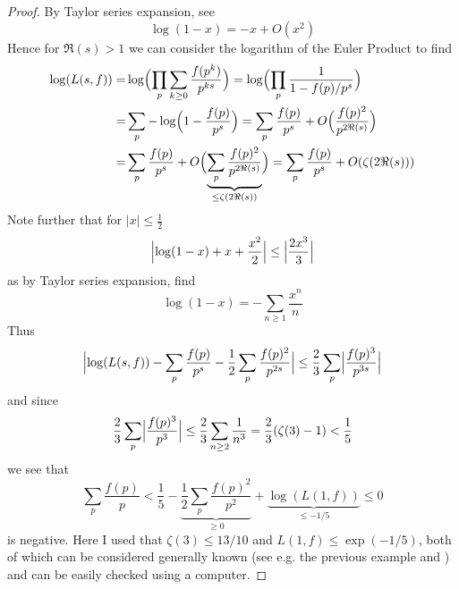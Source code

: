 \documentclass{scrartcl}
\theoremstyle{definition}
\begin{document}
\begin{proof}
    By Taylor series expansion, see
    \begin{equation*}
        \log(1 - x) = -x + O(x^2)
    \end{equation*}
    Hence for $\Re(s) > 1$ we can consider the logarithm of the Euler Product to find
    \begin{align*}
        \log( L(s, f) ) =& \log\Bigl( \prod_p \sum_{k \geq 0} \frac {f(p^k)} {p^{ks}} \Bigr) = \log\Bigl( \prod_p \frac 1 {1 - f(p)/p^s} \Bigr) \\
        =& \sum_p -\log\Bigl( 1 - \frac {f(p)} {p^s} \Bigr) = \sum_p \frac {f(p)} {p^s} + O\Bigl( \frac {f(p)^2} {p^{2\Re(s)}} \Bigr) \\
        = & \sum_p \frac {f(p)} {p^s} + O\Bigl( \underbrace{\sum_p \frac {f(p)^2} {p^{2\Re(s)}}}_{\leq \zeta(2\Re(s))} \Bigr) = \sum_p \frac {f(p)} {p^s} + O(\zeta(2\Re(s)))
    \end{align*}
    Note further that for $|x| \leq \frac 1 2$
    \begin{align*}
        \Bigl| \log(1 - x) + x + \frac {x^2} 2 \Bigr| \leq \Bigl| \frac {2x^3} 3 \Bigr|
    \end{align*}
    as by Taylor series expansion, find
    \begin{equation*}
        \log(1 - x) = -\sum_{n \geq 1} \frac {x^n} {n}
    \end{equation*}
    Thus
    \begin{align*}
        \Bigl| \log(L(s, f)) - \sum_p \frac {f(p)} {p^s} - \frac 1 2 \sum_p \frac {f(p)^2} {p^{2s}} \Bigr| \leq \frac 2 3 \sum_p \Bigl| \frac {f(p)^3} {p^{3s}} \Bigr|
    \end{align*}
    and since
    \begin{equation*}
        \frac 2 3 \sum_p \Bigl| \frac {f(p)^3} {p^3} \Bigr| \leq \frac 2 3 \sum_{n \geq 2} \frac 1 {n^3} = \frac 2 3 (\zeta(3) - 1) < \frac 1 5
    \end{equation*}
    we see that
    \begin{equation*}
        \sum_p \frac {f(p)} p < \frac 1 5 - \underbrace{\frac 1 2 \sum_p \frac {f(p)^2} {p^2}}_{\geq 0} + \underbrace{\log(L(1, f))}_{\leq -1/5} \leq 0
    \end{equation*}
    is negative.
    Here I used that $\zeta(3) \leq 13/10$ and $L(1, f) \leq \exp(-1/5)$, both of which can be considered generally known (see e.g. the previous example and \cite{wolfram_alpha}) and can be easily checked using a computer.
\end{proof}
\end{document}
